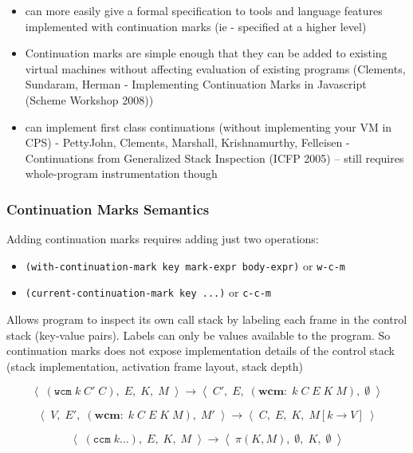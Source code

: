 \documentclass[12pt]{article}	%
\newcommand{\cekm}[4]{ \ensuremath{\left\langle \; #1, \; #2, \; #3, \; #4 \; \right\rangle} }
\newcommand{\wcm}{ \texttt{wcm} }
\newcommand{\ccm}{ \texttt{ccm} }
\newcommand{\wcmfn}[3]{ \ensuremath{ (\wcm \; #1 \; #2 \; #3) } }
\newcommand{\ccmfn}[1]{ \ensuremath{ (\ccm \; #1) } }
\newcommand{\wcmK}[5]{ \ensuremath{ (\textbf{wcm}: \; #1 \; #2 \; #3 \; #4 \; #5) } }
\begin{document}
\begin{itemize}
	\item can more easily give a formal specification to tools and language features implemented with continuation marks (ie - specified at a higher level)
	\item Continuation marks are simple enough that they can be added to existing virtual machines without affecting evaluation of existing programs (Clements, Sundaram, Herman - Implementing Continuation Marks in Javascript (Scheme Workshop 2008))
	\item can implement first class continuations (without implementing your VM in CPS) - PettyJohn, Clements, Marshall, Krishnamurthy, Felleisen - Continuations from Generalized Stack Inspection (ICFP 2005) -- still requires whole-program instrumentation though
\end{itemize}

\subsubsection{Continuation Marks Semantics}

Adding continuation marks requires adding just two operations:

\begin{itemize}
	\item \texttt{(with-continuation-mark key mark-expr body-expr)} or \texttt{w-c-m}
	\item \texttt{(current-continuation-mark key ...)} or \texttt{c-c-m}
\end{itemize}

Allows program to inspect its own call stack by labeling each frame in the control stack (key-value pairs). Labels can only be values available to the program. So continuation marks does not expose implementation details of the control stack (stack implementation, activation frame layout, stack depth)


$$\cekm{ \wcmfn{k}{C'}{C} }
       { E }
       { K }
       { M }
	\rightarrow
  \cekm{ C' }
       { E }
       { \wcmK{k}{C}{E}{K}{M} }
       { \emptyset }$$

$$\cekm{ V }
     { E' }
     { \wcmK{k}{C}{E}{K}{M} }
     { M' }
  \rightarrow
  \cekm{ C }
       { E }
       { K }
       { M[k \rightarrow V] }$$


$$\cekm{ \ccmfn{k\ldots} }
       { E }
       { K }
       { M }
  \rightarrow
\cekm{ \pi(K,M) }
     { \emptyset }
     { K }
     { \emptyset }$$
     
\end{document}
